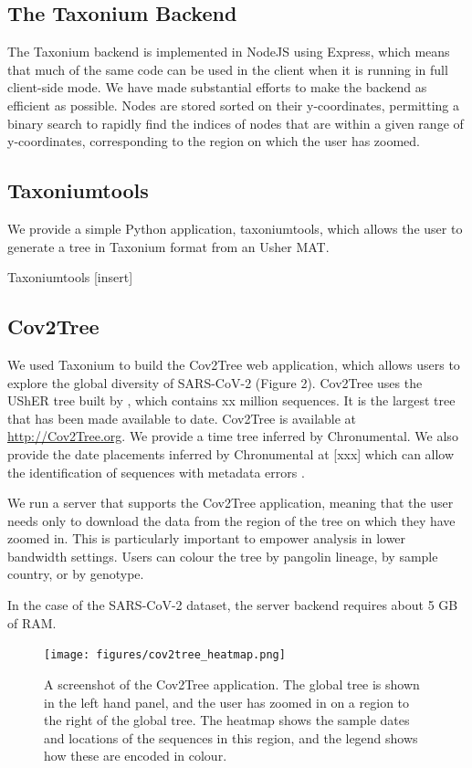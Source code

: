 \subsection*{The Taxonium Backend}

The Taxonium backend is implemented in NodeJS using Express, which means that much of the same code can be used in the client when it is running in full client-side mode. We have made substantial efforts to make the backend as efficient as possible. Nodes are stored sorted on their y-coordinates, permitting a binary search to rapidly find the indices of nodes that are within a given range of y-coordinates, corresponding to the region on which the user has zoomed.

\subsection*{Taxoniumtools}

We provide a simple Python application, taxoniumtools, which allows the user to generate a tree in Taxonium format from an Usher MAT.

Taxoniumtools [insert]


\subsection*{Cov2Tree}

We used Taxonium to build the Cov2Tree web application, which allows users to explore the global diversity of SARS-CoV-2 (Figure 2). Cov2Tree uses the UShER tree built by \cite{regular_updated}, which contains xx million sequences. It is the largest tree that has been made available to date. Cov2Tree is available at \url{http://Cov2Tree.org}. We provide a time tree inferred by Chronumental. We also provide the date placements inferred by Chronumental at [xxx] which can allow the identification of sequences with metadata errors \cite{chronumental}.

We run a server that supports the Cov2Tree application, meaning that the user needs only to download the data from the region of the tree on which they have zoomed in. This is particularly important to empower analysis in lower bandwidth settings. Users can colour the tree by pangolin lineage, by sample country, or by genotype.

In the case of the SARS-CoV-2 dataset, the server backend requires about 5 GB of RAM.




\begin{figure}
\begin{center}
\texttt{[image: figures/cov2tree\_heatmap.png]}
\end{center}
\caption{
A screenshot of the Cov2Tree application. The global tree is shown in the left hand panel, and the user has zoomed in on a region to the right of the global tree. The heatmap shows the sample dates and locations of the sequences in this region, and the legend shows how these are encoded in colour.
}
\label{fig:cov2tree}
\end{figure}


